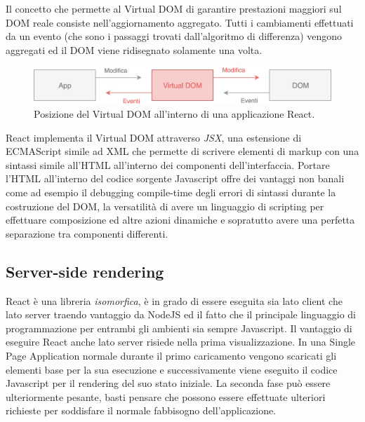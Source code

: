 Il concetto che permette al Virtual DOM di garantire prestazioni maggiori sul DOM reale consiste nell'aggiornamento aggregato. Tutti i cambiamenti effettuati da un evento (che sono i passaggi trovati dall'algoritmo di differenza) vengono aggregati ed il DOM viene ridisegnato solamente una volta.

\begin{figure}[h]
\centering 
\includegraphics[width=13cm]{./images/virtualDOMWorkflow}
\caption{Posizione del Virtual DOM all'interno di una applicazione React.}
\end{figure}

React implementa il Virtual DOM attraverso \textit{JSX}, una estensione di ECMAScript simile ad XML che permette di scrivere elementi di markup con una sintassi simile all'HTML all'interno dei componenti dell'interfaccia. Portare l'HTML all'interno del codice sorgente Javascript offre dei vantaggi non banali come ad esempio il debugging compile-time degli errori di sintassi durante la costruzione del DOM, la versatilità di avere un linguaggio di scripting per effettuare composizione ed altre azioni dinamiche e sopratutto avere una perfetta separazione tra componenti differenti.


\subsection{Server-side rendering}
React è una libreria \textit{isomorfica}, è in grado di essere eseguita sia lato client che lato server traendo vantaggio da NodeJS ed il fatto che il principale linguaggio di programmazione per entrambi gli ambienti sia sempre Javascript.
Il vantaggio di eseguire React anche lato server risiede nella prima visualizzazione. In una Single Page Application normale durante il primo caricamento vengono scaricati gli elementi base per la sua esecuzione e successivamente viene eseguito il codice Javascript per il rendering del suo stato iniziale. La seconda fase può essere ulteriormente pesante, basti pensare che possono essere effettuate ulteriori richieste per soddisfare il normale fabbisogno dell'applicazione.

